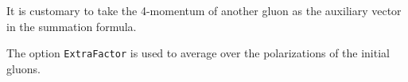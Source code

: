 \documentclass[../FeynCalcManual.tex]{subfiles}
\begin{document}
It is customary to take the 4-momentum of another gluon as the auxiliary
vector in the summation formula.

The option \texttt{ExtraFactor} is used to average over the
polarizations of the initial gluons.

\begin{Shaded}
\begin{Highlighting}[]
\OperatorTok{[}\OperatorTok{,} \OperatorTok{,} \OperatorTok{]}\NormalTok{; }
 
\OperatorTok{[]}\NormalTok{; }
 
\OperatorTok{[}\OperatorTok{]} \ExtensionTok{=} \NormalTok{; }
 
\OperatorTok{[}\OperatorTok{]} \ExtensionTok{=} \NormalTok{;}
\end{Highlighting}
\end{Shaded}
\end{document}
